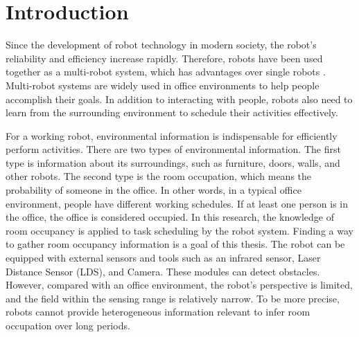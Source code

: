 





\chapter{Introduction}
Since the development of robot technology in modern society, the robot's reliability and efficiency increase rapidly. Therefore, robots have been used together as a multi-robot system, which has advantages over single robots \cite{Eijyne2020DevelopmentOA}. Multi-robot systems are widely used in office environments to help people accomplish their goals. In addition to interacting with people, robots also need to learn from the surrounding environment to schedule their activities effectively. 

 For a working robot, environmental information is indispensable for efficiently perform activities. There are two types of environmental information. The first type is information about its surroundings, such as furniture, doors, walls, and other robots. The second type is the room occupation, which means the probability of someone in the office. In other words, in a typical office environment, people have different working schedules. If at least one person is in the office, the office is considered occupied. In this research, the knowledge of room occupancy is applied to task scheduling by the robot system. Finding a way to gather room occupancy information is a goal of this thesis. The robot can be equipped with external sensors and tools such as an infrared sensor, Laser Distance Sensor (LDS), and Camera. These modules can detect obstacles. However, compared with an office environment, the robot's perspective is limited, and the field within the sensing range is relatively narrow. To be more precise, robots cannot provide heterogeneous information relevant to infer room occupation over long periods. 

